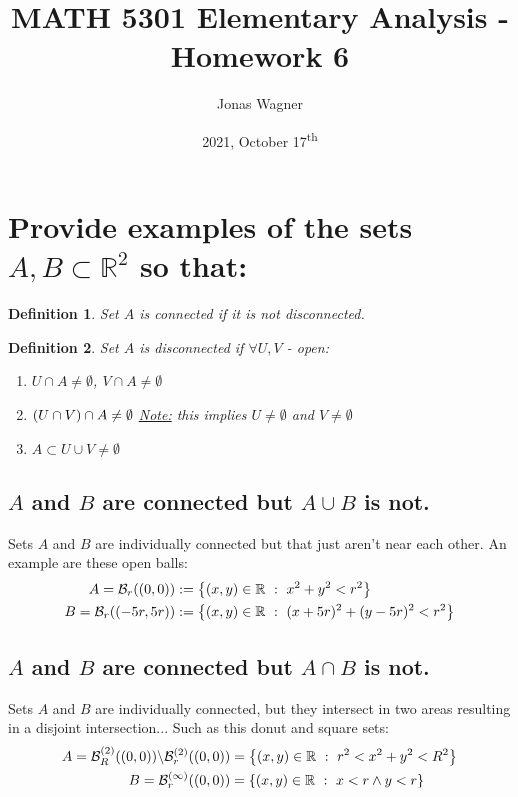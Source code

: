 \documentclass[]{article}
\title{MATH 5301 Elementary Analysis - Homework 6}
\author{Jonas Wagner}
\date{2021, October 17\textsuperscript{th}}
\newcommand{\R}{\mathbb{R}}
\newcommand{\st}{\ : \ }
\newtheorem{definition}{Definition}
\begin{document}
\maketitle

\section{Provide examples of the sets $A,B \subset \R^2$ so that:}

\begin{definition}
    Set $A$ is \emph{connected} if it is not disconnected.
\end{definition}
\begin{definition}
    Set $A$ is \emph{disconnected} if $\forall U, V$ - open: 
    \begin{enumerate}
        \item $U \cap A \neq \emptyset$, $V \cap A \neq \emptyset$
        \item $\qty(U \cap V) \cap A \neq \emptyset$ \quad \underline{Note:} this implies $U \neq \emptyset$ and $V \neq \emptyset$
        \item $A \subset U \cup V \neq \emptyset$
    \end{enumerate}
\end{definition}

\subsection{$A$ and $B$ are connected but $A \cup B$ is not.}
Sets $A$ and $B$ are individually connected but that just aren't near each other. An example are these open balls:
\begin{align*}
    A = \mathcal{B}_{r}((0,0))
        &:= \qty{(x,y)\in\R \st x^2 + y^2 < r^2}\\
    B = \mathcal{B}_{r}((-5r,5r))
        &:= \qty{(x,y)\in\R \st (x+5r)^2 + (y-5r)^2 < r^2}
\end{align*}

\subsection{$A$ and $B$ are connected but $A \cap B$ is not.}
Sets $A$ and $B$ are individually connected, but they intersect in two areas resulting in a disjoint intersection... Such as this donut and square sets:
\begin{align*}
    A = \mathcal{B}^{(2)}_{R}((0,0)) \backslash \mathcal{B}^{(2)}_{r}((0,0))
        &= \qty{(x,y)\in\R \st r^2 < x^2 + y^2 < R^2}\\
    B = \mathcal{B}^{(\infty)}_{r}((0,0))
        &= \qty{(x,y) \in \R \st x < r \land y < r}
\end{align*}
\end{document}

